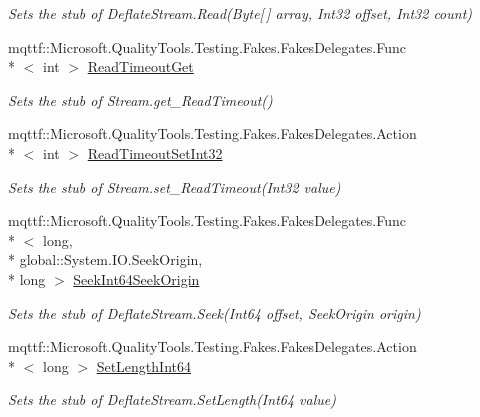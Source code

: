 \begin{DoxyCompactItemize}
\begin{DoxyCompactList}\small\item\em Sets the stub of Deflate\-Stream.\-Read(\-Byte\mbox{[}$\,$\mbox{]} array, Int32 offset, Int32 count)\end{DoxyCompactList}\item 
mqttf\-::\-Microsoft.\-Quality\-Tools.\-Testing.\-Fakes.\-Fakes\-Delegates.\-Func\\*
$<$ int $>$ \hyperlink{class_system_1_1_i_o_1_1_compression_1_1_fakes_1_1_stub_deflate_stream_a35ae91c87e2e522d666d6c0703bf8381}{Read\-Timeout\-Get}
\begin{DoxyCompactList}\small\item\em Sets the stub of Stream.\-get\-\_\-\-Read\-Timeout()\end{DoxyCompactList}\item 
mqttf\-::\-Microsoft.\-Quality\-Tools.\-Testing.\-Fakes.\-Fakes\-Delegates.\-Action\\*
$<$ int $>$ \hyperlink{class_system_1_1_i_o_1_1_compression_1_1_fakes_1_1_stub_deflate_stream_a74ad60771916d596a15e1144749ce4bb}{Read\-Timeout\-Set\-Int32}
\begin{DoxyCompactList}\small\item\em Sets the stub of Stream.\-set\-\_\-\-Read\-Timeout(\-Int32 value)\end{DoxyCompactList}\item 
mqttf\-::\-Microsoft.\-Quality\-Tools.\-Testing.\-Fakes.\-Fakes\-Delegates.\-Func\\*
$<$ long, \\*
global\-::\-System.\-I\-O.\-Seek\-Origin, \\*
long $>$ \hyperlink{class_system_1_1_i_o_1_1_compression_1_1_fakes_1_1_stub_deflate_stream_a8854eeb786db83fa6cc7dc52484bd2d9}{Seek\-Int64\-Seek\-Origin}
\begin{DoxyCompactList}\small\item\em Sets the stub of Deflate\-Stream.\-Seek(\-Int64 offset, Seek\-Origin origin)\end{DoxyCompactList}\item 
mqttf\-::\-Microsoft.\-Quality\-Tools.\-Testing.\-Fakes.\-Fakes\-Delegates.\-Action\\*
$<$ long $>$ \hyperlink{class_system_1_1_i_o_1_1_compression_1_1_fakes_1_1_stub_deflate_stream_a8cd473b9b62fa624ae8c9b05c9783995}{Set\-Length\-Int64}
\begin{DoxyCompactList}\small\item\em Sets the stub of Deflate\-Stream.\-Set\-Length(\-Int64 value)\end{DoxyCompactList}\item 

\end{DoxyCompactItemize}
